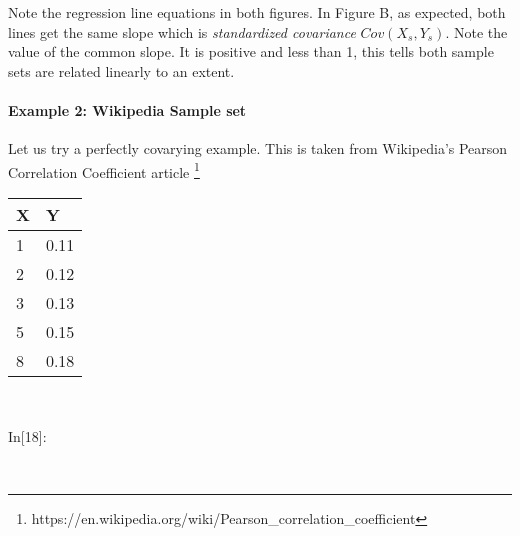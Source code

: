 \documentclass[float=false,crop=false]{standalone}
\begin{document}
    Note the regression line equations in both figures. In Figure B, as
expected, both lines get the same slope which is \emph{standardized
covariance} \(Cov(X_s,Y_s)\). Note the value of the common slope. It is
positive and less than 1, this tells both sample sets are related
linearly to an extent.

    \paragraph{Example 2: Wikipedia Sample
set}\label{example-2-wikipedia-sample-set}

Let us try a perfectly covarying example.
This is taken from Wikipedia's Pearson Correlation Coefficient article \footnote{https://en.wikipedia.org/wiki/Pearson\_correlation\_coefficient}
    \begin{longtable}[]{@{}ll@{}}
\toprule
X & Y\tabularnewline
\midrule
\endhead
1 & 0.11\tabularnewline
2 & 0.12\tabularnewline
3 & 0.13\tabularnewline
5 & 0.15\tabularnewline
8 & 0.18\tabularnewline
\bottomrule
\end{longtable}

    ~
\begin{InVerbatim}[commandchars=\\\{\},fontsize=\scriptsize]
{\color{incolor}In[{\color{incolor}18}]:}   \PY{p}{[}\PY{p}{]}   
           \PY{p}{[}\PY{p}{]}
         
             
           \PY{p}{[}\PY{p}{]}  
           \PY{p}{[}\PY{p}{]}   
\end{InVerbatim}
    \begin{center}
    \end{center}
    { \hspace*{\fill} \\}
    
\end{document}

